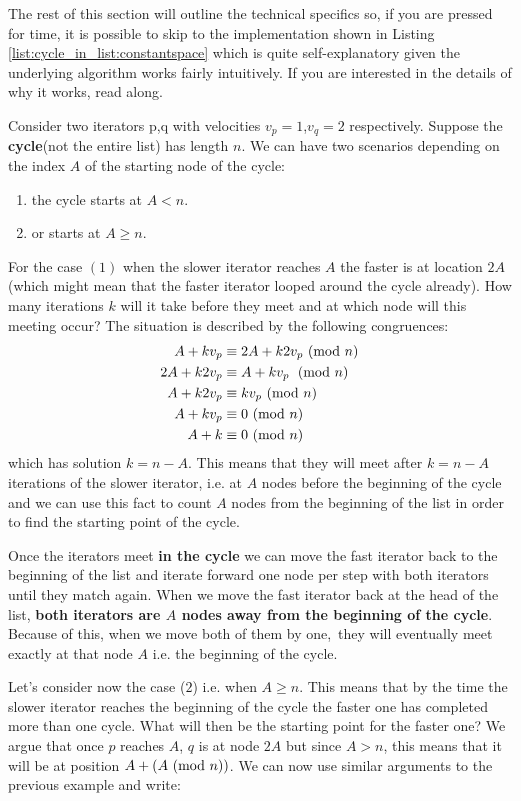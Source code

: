 The rest of this section will outline the  technical specifics so, if you are pressed for time, it is possible to skip to
the implementation shown in Listing \ref{list:cycle_in_list:constantspace} which is quite self-explanatory given the underlying algorithm works fairly intuitively. If you
are interested in the details of why it works, read along. 


Consider two iterators p,q with velocities $v_p=1$,$v_q=2$  respectively. Suppose the
\textbf{cycle}(not the entire list) has length $n$. We can have two scenarios depending on the index
$A$ of the starting node of the cycle:

\begin{enumerate}
\item the cycle starts at $A < n$.
\item or  starts at \(A \geq n\).
\end{enumerate}
For the case $(1)$ when the slower iterator reaches $A$ the faster is at location $2A$ (which might
mean that the faster iterator looped around the cycle already). How many iterations $k$ will it take
before they meet and at which node will this meeting occur?
The situation is described by the following congruences:
\begin{align}
  A + kv_p &\equiv 2A + k2v_p \ (\mathrm{mod}\ n) \\
  2A + k2v_p &\equiv A + kv_p \;  \ (\mathrm{mod}\ n) \\
  A + k2v_p &\equiv kv_p   \ (\mathrm{mod}\ n) \\
  A +kv_p &\equiv 0   \ (\mathrm{mod}\ n) \\
  A +k &\equiv 0  \ (\mathrm{mod}\ n)
\end{align}
which has solution \(k = n-A\). This means that they will meet after \(k=n-A\) iterations of the
slower iterator, i.e. at \(A\) nodes before the beginning of the cycle and we can use this fact to
count \(A\) nodes from the beginning of the list in order to find the starting point of the cycle. 

Once the iterators meet \textbf{in the cycle} we can move the fast iterator back to the
beginning of the list and iterate forward one node per step with both iterators until they match
again. When we move the fast iterator back at the head of the list, \textbf{both iterators are \(A\)
nodes away from the beginning of the cycle}. Because of this, when we move both of them by one, they
will eventually meet exactly at that node \(A\) i.e. the beginning of the cycle.


Let's consider now the case ($2$) i.e.  when \(A \geq n\). This means that by the time the slower
iterator reaches the beginning of the cycle the faster one has completed more than one  cycle. What
will then be the starting point for the faster one? We argue that once \(p\) reaches \(A\), \(q\) is at
node \(2A\) but since \(A > n\), this means that it will be at position \(A + (A \ (\mathrm{mod}\ n))\). We can
now use similar arguments to the previous example and write:

